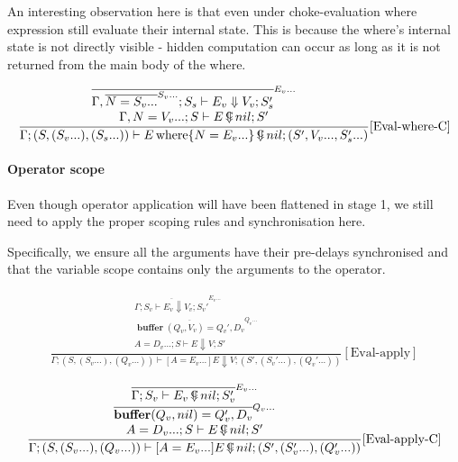 \documentclass{scrartcl}
\DeclareMathOperator{\where}{where}
\DeclareMathOperator{\ceval}{\overset{C}{\smash{\Downarrow}}}
\DeclareMathOperator{\buffer}{\mathbf{buffer}}
\begin{document}
    An interesting observation here is that even under choke-evaluation where expression still evaluate their internal state. This is because the where's internal state is not directly visible - hidden computation can occur as long as it is not returned from the main body of the where.
    
    \begin{align*}
    \frac{
        \begin{matrix}
        \overline{\Gamma, \overline{N=S_v...}^{S_v...}; S_s \vdash E_v \Downarrow V_v; S_s'}^{E_v...} \\
        \Gamma, N=V_v...; S \vdash E \ceval nil; S' \\
        \end{matrix}
    }{
        \Gamma; (S, (S_v...), (S_s...)) \vdash E \where \{ N=E_v... \} \ceval nil; (S', V_v..., S_s'...)
    }[\text{Eval-where-C}]
    \end{align*}
    
    \paragraph{Operator scope}
    
    Even though operator application will have been flattened in stage 1, we still need to apply the proper scoping rules and synchronisation here.
    
    Specifically, we ensure all the arguments have their pre-delays synchronised and that the variable scope contains only the arguments to the operator.
    
    \begin{align*}
    \frac{
        \begin{matrix}
        \overline{\Gamma; S_v \vdash E_v \Downarrow V_v; S_v'}^{E_v...} \\
        \overline{\buffer(Q_v, V_v) = Q_v', D_v}^{Q_v...} \\
        A = D_v...; S \vdash E \Downarrow V; S'
        \end{matrix}
    }{
        \Gamma; (S, (S_v...), (Q_v...)) \vdash [A=E_v...]E \Downarrow V; (S', (S_v'...), (Q_v'...))
    }[\text{Eval-apply}]
    \end{align*}
    
    \begin{align*}
    \frac{
        \begin{matrix}
        \overline{\Gamma; S_v \vdash E_v \ceval nil; S_v'}^{E_v...} \\
        \overline{\buffer(Q_v, nil) = Q_v', D_v}^{Q_v...} \\
        A = D_v...; S \vdash E \ceval nil; S'
        \end{matrix}
    }{
        \Gamma; (S, (S_v...), (Q_v...)) \vdash [A=E_v...]E \ceval nil; (S', (S_v'...), (Q_v'...))
    }[\text{Eval-apply-C}]
    \end{align*}
    
\end{document}
